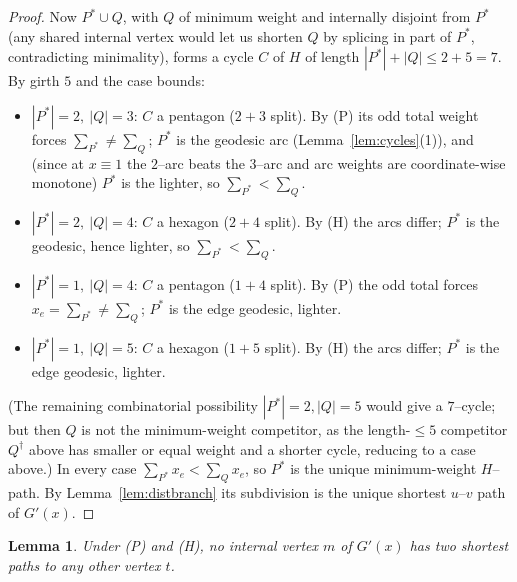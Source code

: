\documentclass{amsart}
\newtheorem{lemma}{Lemma}
\theoremstyle{definition}
\begin{document}
\begin{proof}
Now $P^\ast\cup Q$, with $Q$ of minimum weight and internally disjoint from
$P^\ast$ (any shared internal vertex would let us shorten $Q$ by splicing in part
of $P^\ast$, contradicting minimality), forms a cycle $C$ of $H$ of length
$|P^\ast|+|Q|\le 2+5=7$. By girth $5$ and the case bounds:
\begin{itemize}
\item $|P^\ast|=2,\ |Q|=3$: $C$ a pentagon ($2{+}3$ split). By (P) its odd total
weight forces $\sum_{P^\ast}\ne\sum_Q$; $P^\ast$ is the geodesic arc
(Lemma~\ref{lem:cycles}(1)), and (since at $x\equiv1$ the $2$--arc beats the
$3$--arc and arc weights are coordinate-wise monotone) $P^\ast$ is the lighter,
so $\sum_{P^\ast}<\sum_Q$.
\item $|P^\ast|=2,\ |Q|=4$: $C$ a hexagon ($2{+}4$ split). By (H) the arcs
differ; $P^\ast$ is the geodesic, hence lighter, so $\sum_{P^\ast}<\sum_Q$.
\item $|P^\ast|=1,\ |Q|=4$: $C$ a pentagon ($1{+}4$ split). By (P) the odd total
forces $x_e=\sum_{P^\ast}\ne\sum_Q$; $P^\ast$ is the edge geodesic, lighter.
\item $|P^\ast|=1,\ |Q|=5$: $C$ a hexagon ($1{+}5$ split). By (H) the arcs
differ; $P^\ast$ is the edge geodesic, lighter.
\end{itemize}
(The remaining combinatorial possibility $|P^\ast|=2,|Q|=5$ would give a
$7$--cycle; but then $Q$ is not the minimum-weight competitor, as the length-$\le5$
competitor $Q^\dagger$ above has smaller or equal weight and a shorter cycle,
reducing to a case above.) In every case $\sum_{P^\ast}x_e<\sum_Q x_e$, so
$P^\ast$ is the unique minimum-weight $H$--path. By Lemma~\ref{lem:distbranch}
its subdivision is the unique shortest $u$--$v$ path of $G'(x)$.
\end{proof}

\begin{lemma}\label{lem:pentinternal}
Under \textnormal{(P)} and \textnormal{(H)}, no internal vertex $m$ of $G'(x)$
has two shortest paths to any other vertex $t$.
\end{lemma}
\end{document}
